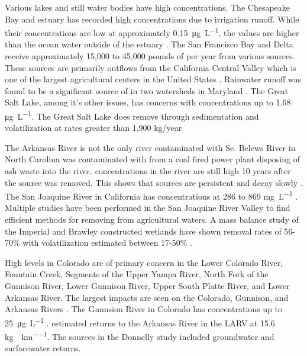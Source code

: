 Various lakes and still water bodies have high \Se concentrations.  The Chesapeake Bay and estuary has recorded high \Se concentrations due to irrigation runoff.  While their concentrations are low at approximately \SI{0.15}{\micro\g\per\liter}, the values are higher than the ocean water outside of the estuary \parencite{Takayanagi1984}.  The San Francisco Bay and Delta receive approximately 15,000 to 45,000 pounds of \Se per year from various sources.  These sources are primarily outflows from the California Central Valley which is one of the largest agricultural centers in the United States \parencite{2000luoma}.  Rainwater runoff was found to be a significant source of \Se in two watersheds in Maryland \parencite{Lawson2001}.  The Great Salt Lake, among it's other issues, has \Se concerns with concentrations up to 1.68 \si{\micro\g\per\liter}.  The Great Salt Lake does remove \Se through sedimentation and volatilization at rates greater than 1,900 kg/year \parencite{2008naftz,oliver2009}

The Arkansas River is not the only river contaminated with Se.  Belews River in North Carolina was contaminated with \Se from a coal fired power plant disposing of ash waste into the river.  \Se concentrations in the river are still high 10 years after the source was removed.  This shows that \Se sources are persistent and decay slowly \parencite{Lemly2002}.   The San Joaquine River in California has \Se concentrations at 286 to 869 \si{\milli\g\per\liter} \parencite{Clifton1989}.  Multiple studies have been performed in the San Joaquine River Valley to find efficient methods for removing \Se from agricultural waters.  A mass balance study of the Imperial and Brawley constructed wetlands have shown removal rates of 56-70\% with volatilization estimated between 17-50\% \parencite{Gersberg2006}.

High \Se levels in Colorado are of primary concern in the Lower Colorado River, Fountain Creek, Segments of the Upper Yampa River, North Fork of the Gunnison River, Lower Gunnison River, Upper South Platte River, and Lower Arkansas River.  The largest impacts are seen on the Colorado, Gunnison, and Arkansas Rivers \parencite{5CCR1002-93}.  The Gunnsion River in Colorado has \Se concentrations up to \SI{25}{\micro\g\per\liter} \parencite{2008USBR}.  \textcite{2005Donnelly} estimated \Se returns to the Arkansas River in the LARV at 15.6 \si{\kilo\g\per\year\per\kilo\meter}.  The sources in the Donnelly study included groundwater and surfacewater returns.

